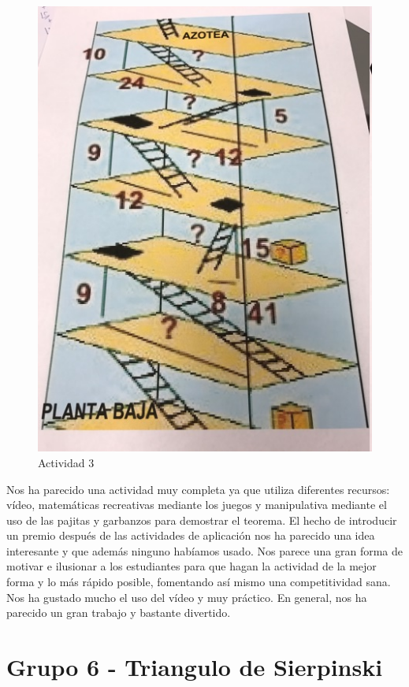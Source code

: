 \begin{itemize}
\begin{figure}[hbtp]
\centering
\includegraphics{img/grupo5_3.jpg}
\caption{Actividad 3}
\end{figure}

\end{itemize}

Nos ha parecido una actividad muy completa ya que utiliza diferentes recursos: vídeo, matemáticas recreativas mediante los juegos y manipulativa mediante el uso de las pajitas y garbanzos para demostrar el teorema. El hecho de introducir un premio después de las actividades de aplicación nos ha parecido una idea interesante y que además ninguno habíamos usado. Nos parece una gran forma de motivar e ilusionar a los estudiantes para que hagan la actividad de la mejor forma y lo más rápido posible, fomentando así mismo una competitividad sana. Nos ha gustado mucho el uso del vídeo y muy práctico. En general, nos ha parecido un gran trabajo y bastante divertido.



\section*{Grupo 6 - Triangulo de Sierpinski}

